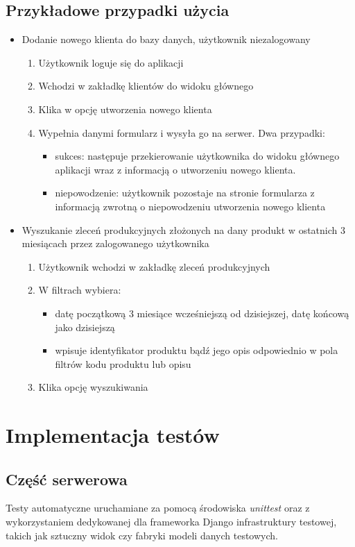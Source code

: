 \documentclass[declaration,shortabstract]{iithesis}
\begin{document}
\subsection{Przykładowe przypadki użycia}
\begin{itemize}
	\item Dodanie nowego klienta do bazy danych, użytkownik niezalogowany
	\begin{enumerate}
		\item Użytkownik loguje się do aplikacji
		\item Wchodzi w zakładkę klientów do widoku głównego
		\item Klika w opcję utworzenia nowego klienta
		\item Wypełnia danymi formularz i wysyła go na serwer.
		Dwa przypadki:
		\begin{itemize}
		\item sukces: następuje przekierowanie użytkownika do widoku głównego aplikacji wraz z informacją o utworzeniu nowego klienta.
		\item niepowodzenie: użytkownik pozostaje na stronie formularza z informacją zwrotną o niepowodzeniu utworzenia nowego klienta
		\end{itemize}
	\end{enumerate}

	\item Wyszukanie zleceń produkcyjnych złożonych na dany 			  produkt w ostatnich 3 miesiącach przez zalogowanego użytkownika
	\begin{enumerate}
		\item Użytkownik wchodzi w zakładkę zleceń produkcyjnych
		\item W filtrach wybiera: 
		\begin{itemize} 
			\item datę początkową 3 miesiące wcześniejszą od dzisiejszej, datę końcową jako dzisiejszą
			\item wpisuje identyfikator produktu bądź jego opis odpowiednio w pola filtrów kodu produktu lub opisu
		\end{itemize}
		\item Klika opcję wyszukiwania
	\end{enumerate}	
\end{itemize}


\section{Implementacja testów}
\subsection{Część serwerowa}
Testy automatyczne uruchamiane za pomocą środowiska \emph{unittest} oraz z wykorzystaniem dedykowanej dla frameworka Django infrastruktury testowej, takich jak sztuczny widok czy fabryki modeli danych testowych.
\end{document}
